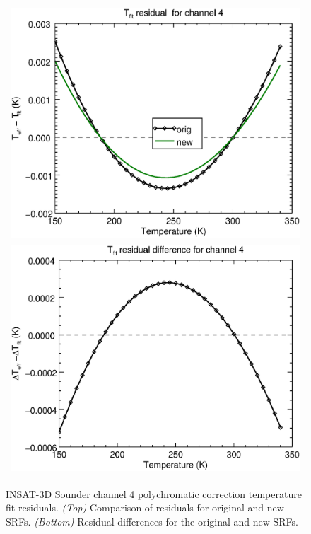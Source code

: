 \begin{figure}[H]
  \centering
  \begin{tabular}{c}
    \includegraphics[scale=0.55]{graphics/sndr/tfit/sndr_insat3d-4.tfit.eps} \\
    \includegraphics[scale=0.55]{graphics/sndr/tfit/sndr_insat3d-4.tfit.difference.eps}
  \end{tabular}
  \caption{INSAT-3D Sounder channel 4 polychromatic correction temperature fit residuals. \emph{(Top)} Comparison of residuals for original and new SRFs. \emph{(Bottom)} Residual differences for the original and new SRFs.}
  \label{fig:sndr_ch4_tfit}
\end{figure}


